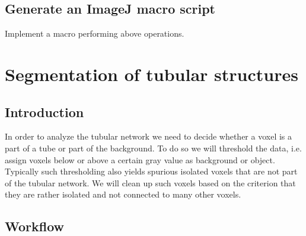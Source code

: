 \subsection{Generate an ImageJ macro script}
Implement a macro performing above operations.



\section{Segmentation of tubular structures}

\subsection{Introduction}
In order to analyze the tubular network we need to decide whether a voxel is a part of a tube or part of the background. To do so we will threshold the data, i.e. assign voxels below or above a certain gray value as background or object. Typically such thresholding also yields spurious isolated voxels that are not part of the tubular network. We will clean up such voxels based on the criterion that they are rather isolated and not connected to many other voxels.

\subsection{Workflow}

